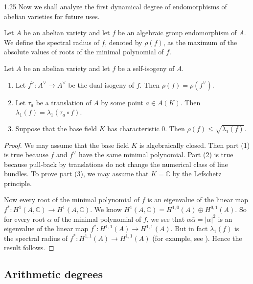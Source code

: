 \documentclass[12pt]{amsart}
\begin{document}
\begin{spacing}{1.25}
Now we shall analyze the first dynamical degree of endomorphisms of abelian varieties for future uses.

\begin{definition}
Let $A$ be an abelian variety and let $f$ be an algebraic group endomorphism of $A$. We define the spectral radius of $f$, denoted by $\rho(f)$, as the maximum of the absolute values of roots of the minimal polynomial of $f$.
\end{definition}

\begin{proposition}\label{Prop_abel}
Let $A$ be an abelian variety and let $f$ be a self-isogeny of $A$.
\begin{enumerate}
\item
Let $f^{\vee}:A^{\vee}\rightarrow A^{\vee}$ be the dual isogeny of $f$. Then $\rho(f)=\rho(f^{\vee})$.
\item
Let $\tau_a$ be a translation of $A$ by some point $a\in A(K)$. Then $\lambda_1(f)=\lambda_1(\tau_a\circ f)$.
\item
Suppose that the base field $K$ has characteristic 0. Then $\rho(f)\leq\sqrt{\lambda_1(f)}$.
\end{enumerate}
\end{proposition}

\begin{proof}
We may assume that the base field $K$ is algebraically closed. Then part (1) is true because $f$ and $f^{\vee}$ have the same minimal polynomial. Part (2) is true because pull-back by translations do not change the numerical class of line bundles. To prove part (3), we may assume that $K=\mathbb{C}$ by the Lefschetz principle.

Now every root of the minimal polynomial of $f$ is an eigenvalue of the linear map $f^*:H^{1}(A,\mathbb{C})\rightarrow H^{1}(A,\mathbb{C})$. We know $H^{1}(A,\mathbb{C})=H^{1,0}(A)\oplus H^{0,1}(A)$. So for every root $\alpha$ of the minimal polynomial of $f$, we see that $\alpha\bar{\alpha}=|\alpha|^2$ is an eigenvalue of the linear map $f^*:H^{1,1}(A)\rightarrow H^{1,1}(A)$. But in fact $\lambda_1(f)$ is the spectral radius of $f^*:H^{1,1}(A)\rightarrow H^{1,1}(A)$ (for example, see \cite[top of p. 72]{Tru25}). Hence the result follows.
\end{proof}





\subsection{Arithmetic degrees}\label{subsec_arithdeg}


\end{spacing}
\end{document}
